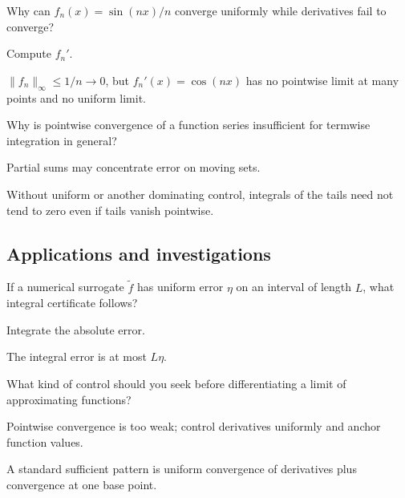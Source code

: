 \begin{exercise}\label{exr:ii12-expand-11}
Why can \(f_n(x)=\sin(nx)/n\) converge uniformly while derivatives fail to converge?
\end{exercise}
\begin{hint}
Compute \(f_n'\).
\end{hint}
\begin{solution}
\(\|f_n\|_\infty\le1/n\to0\), but \(f_n'(x)=\cos(nx)\) has no pointwise limit at many points and no uniform limit.
\end{solution}

\begin{exercise}\label{exr:ii12-expand-12}
Why is pointwise convergence of a function series insufficient for termwise integration in general?
\end{exercise}
\begin{hint}
Partial sums may concentrate error on moving sets.
\end{hint}
\begin{solution}
Without uniform or another dominating control, integrals of the tails need not tend to zero even if tails vanish pointwise.
\end{solution}

\subsection*{Applications and investigations}

\begin{exercise}\label{exr:ii12-expand-13}
If a numerical surrogate \(\tilde f\) has uniform error \(\eta\) on an interval of length \(L\), what integral certificate follows?
\end{exercise}
\begin{hint}
Integrate the absolute error.
\end{hint}
\begin{solution}
The integral error is at most \(L\eta\).
\end{solution}

\begin{exercise}\label{exr:ii12-expand-14}
What kind of control should you seek before differentiating a limit of approximating functions?
\end{exercise}
\begin{hint}
Pointwise convergence is too weak; control derivatives uniformly and anchor function values.
\end{hint}
\begin{solution}
A standard sufficient pattern is uniform convergence of derivatives plus convergence at one base point.
\end{solution}

